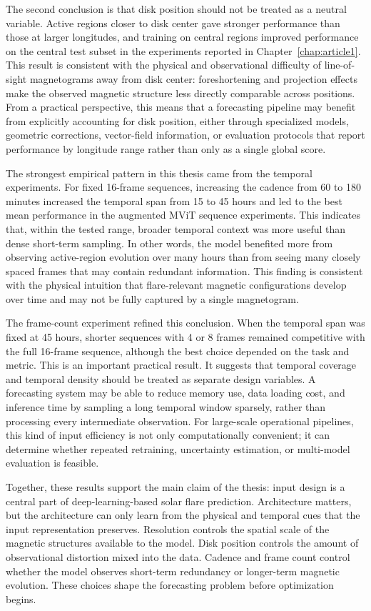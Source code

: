 The second conclusion is that disk position should not be treated as a neutral variable. Active regions closer to disk center gave stronger performance than those at larger longitudes, and training on central regions improved performance on the central test subset in the experiments reported in Chapter~\ref{chap:article1}. This result is consistent with the physical and observational difficulty of line-of-sight magnetograms away from disk center: foreshortening and projection effects make the observed magnetic structure less directly comparable across positions. From a practical perspective, this means that a forecasting pipeline may benefit from explicitly accounting for disk position, either through specialized models, geometric corrections, vector-field information, or evaluation protocols that report performance by longitude range rather than only as a single global score.

The strongest empirical pattern in this thesis came from the temporal experiments. For fixed 16-frame sequences, increasing the cadence from 60 to 180 minutes increased the temporal span from 15 to 45 hours and led to the best mean performance in the augmented MViT sequence experiments. This indicates that, within the tested range, broader temporal context was more useful than dense short-term sampling. In other words, the model benefited more from observing active-region evolution over many hours than from seeing many closely spaced frames that may contain redundant information. This finding is consistent with the physical intuition that flare-relevant magnetic configurations develop over time and may not be fully captured by a single magnetogram.

The frame-count experiment refined this conclusion. When the temporal span was fixed at 45 hours, shorter sequences with 4 or 8 frames remained competitive with the full 16-frame sequence, although the best choice depended on the task and metric. This is an important practical result. It suggests that temporal coverage and temporal density should be treated as separate design variables. A forecasting system may be able to reduce memory use, data loading cost, and inference time by sampling a long temporal window sparsely, rather than processing every intermediate observation. For large-scale operational pipelines, this kind of input efficiency is not only computationally convenient; it can determine whether repeated retraining, uncertainty estimation, or multi-model evaluation is feasible.

Together, these results support the main claim of the thesis: input design is a central part of deep-learning-based solar flare prediction. Architecture matters, but the architecture can only learn from the physical and temporal cues that the input representation preserves. Resolution controls the spatial scale of the magnetic structures available to the model. Disk position controls the amount of observational distortion mixed into the data. Cadence and frame count control whether the model observes short-term redundancy or longer-term magnetic evolution. These choices shape the forecasting problem before optimization begins.


